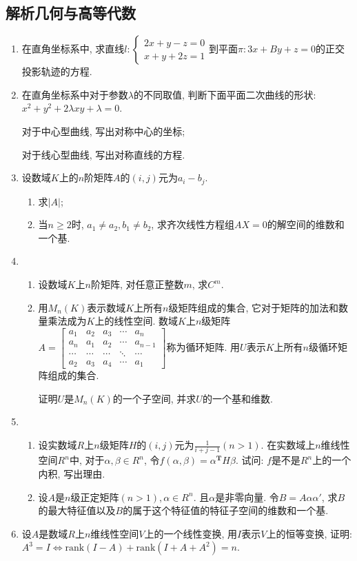 \documentclass[12pt,a4paper,openany]{book}
\begin{document}
\subsection{解析几何与高等代数}
\begin{enumerate}
\item 在直角坐标系中, 求直线$l: \left\{ \begin{aligned} 2x + y - z = 0 \\ x + y + 2z = 1  \end{aligned}\right.$到平面$\pi: 3x + By + z = 0$的正交投影轨迹的方程.
\item 在直角坐标系中对于参数$\lambda$的不同取值, 判断下面平面二次曲线的形状: $x^2 + y^2 + 2\lambda{}xy + \lambda = 0$.

对于中心型曲线, 写出对称中心的坐标;

对于线心型曲线, 写出对称直线的方程.
\item 设数域$K$上的$n$阶矩阵$A$的$(i, j)$元为$a_i - b_j$.
\begin{enumerate}
\item 求$|A|$;
\item 当$n \ge 2$时, $a_1 \neq a_2, b_1 \neq b_2$, 求齐次线性方程组$AX = 0$的解空间的维数和一个基.
\end{enumerate}

\item \begin{enumerate}
\item 设数域$K$上$n$阶矩阵, 对任意正整数$m$, 求$C^m$.
\item 用$M_n(K)$表示数域$K$上所有$n$级矩阵组成的集合, 它对于矩阵的加法和数量乘法成为$K$上的线性空间. 数域$K$上$n$级矩阵$A = \begin{bmatrix} a_1 & a_2 & a_3 & \cdots & a_n \\ a_n & a_1 & a_2 & \cdots & a_{n-1} \\ \cdots & \cdots & \cdots & \ddots & \cdots \\ a_2 & a_3 & a_4 & \cdots & a_1 \end{bmatrix}$称为循环矩阵. 用$U$表示$K$上所有$n$级循环矩阵组成的集合.

证明$U$是$M_n(K)$的一个子空间, 并求$U$的一个基和维数.
\end{enumerate}

\item \begin{enumerate}
\item 设实数域$R$上$n$级矩阵$H$的$(i, j)$元为$\displaystyle\frac{1}{i + j - 1} (n > 1)$. 在实数域上$n$维线性空间$R^n$中, 对于$\alpha, \beta \in R^n$, 令$f(\alpha, \beta) = \alpha^{\bm{T}}H\beta$. 试问: $f$是不是$R^n$上的一个内积, 写出理由.
\item 设$A$是$n$级正定矩阵$(n > 1), \alpha \in R^n$. 且$\alpha$是非零向量. 令$B = A\alpha\alpha'$, 求$B$的最大特征值以及$B$的属于这个特征值的特征子空间的维数和一个基.
\end{enumerate}

\item 设$A$是数域$R$上$n$维线性空间$V$上的一个线性变换, 用$I$表示$V$上的恒等变换, 证明: $A^3 = I \Leftrightarrow \text{rank}(I - A) + \text{rank}(I + A + A^2) = n$.
\end{enumerate}
\end{document}
